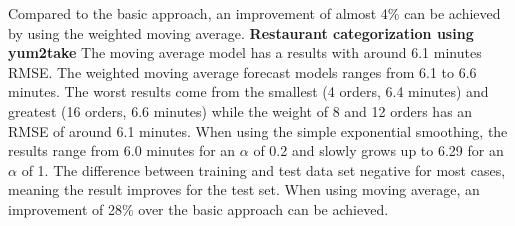 Compared to the basic approach, an improvement of almost 4\% can be achieved by using the weighted moving average.
\newline\newline\textbf{Restaurant categorization using yum2take}\newline
 The moving average model has a results with around 6.1 minutes RMSE. The weighted moving average forecast models ranges from 6.1 to 6.6 minutes. The worst results come from the smallest (4 orders, 6.4 minutes) and greatest (16 orders, 6.6 minutes) while the weight of 8 and 12 orders has an RMSE of around 6.1 minutes. When using the simple exponential smoothing, the results range from 6.0 minutes for an $\alpha$ of 0.2 and slowly grows up to 6.29 for an $\alpha$ of 1. The difference between training and test data set negative for most cases, meaning the result improves for the test set.\newline
 When using moving average, an improvement of 28\% over the basic approach can be achieved.
